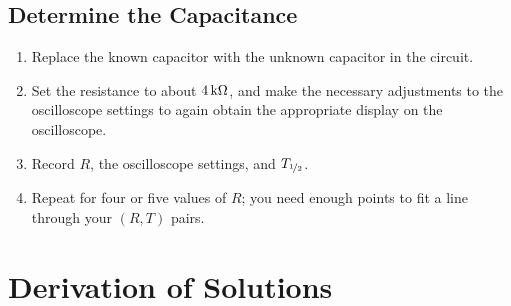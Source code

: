 \documentclass[12pt]{article}
\newcommand{\halflife}{\ensuremath{T_{\nicefrac{1}{2}}}\xspace}
\begin{document}
\subsection{Determine the Capacitance}
\label{sec:capacitance}

\begin{enumerate}
\item Replace the known capacitor with the unknown capacitor in the
  circuit.
\item Set the resistance to about $\unit[4]{k\Omega}$, and make the
  necessary adjustments to the oscilloscope settings to again obtain
  the appropriate display on the oscilloscope.
\item Record $R$, the oscilloscope settings, and \halflife.
\item Repeat for four or five values of $R$; you need enough points to
  fit a line through your $(R,T)$ pairs.
\end{enumerate}

\appendix

\section{Derivation of Solutions}
\label{sec:solutions}
\end{document}
